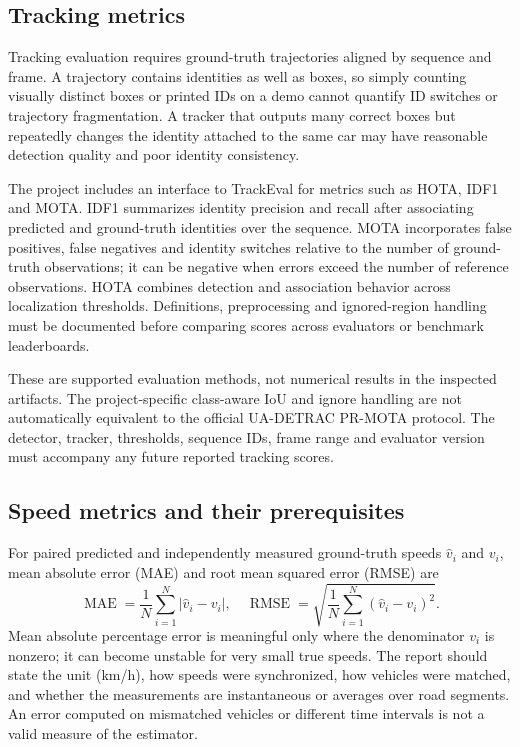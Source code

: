 \subsection{Tracking metrics}
Tracking evaluation requires ground-truth trajectories aligned by sequence and frame. A trajectory contains identities as well as boxes, so simply counting visually distinct boxes or printed IDs on a demo cannot quantify ID switches or trajectory fragmentation. A tracker that outputs many correct boxes but repeatedly changes the identity attached to the same car may have reasonable detection quality and poor identity consistency.

The project includes an interface to TrackEval for metrics such as HOTA, IDF1 and MOTA. IDF1 summarizes identity precision and recall after associating predicted and ground-truth identities over the sequence. MOTA incorporates false positives, false negatives and identity switches relative to the number of ground-truth observations; it can be negative when errors exceed the number of reference observations. HOTA combines detection and association behavior across localization thresholds. Definitions, preprocessing and ignored-region handling must be documented before comparing scores across evaluators or benchmark leaderboards.

These are supported evaluation methods, not numerical results in the inspected artifacts. The project-specific class-aware IoU and ignore handling are not automatically equivalent to the official UA-DETRAC PR-MOTA protocol. The detector, tracker, thresholds, sequence IDs, frame range and evaluator version must accompany any future reported tracking scores.

\subsection{Speed metrics and their prerequisites}
For paired predicted and independently measured ground-truth speeds $\widehat v_i$ and $v_i$, mean absolute error (MAE) and root mean squared error (RMSE) are
\begin{equation}
\operatorname{MAE}=\frac{1}{N}\sum_{i=1}^{N}|\widehat v_i-v_i|,\quad
\operatorname{RMSE}=\sqrt{\frac{1}{N}\sum_{i=1}^{N}(\widehat v_i-v_i)^2}.
\end{equation}
Mean absolute percentage error is meaningful only where the denominator $v_i$ is nonzero; it can become unstable for very small true speeds. The report should state the unit (km/h), how speeds were synchronized, how vehicles were matched, and whether the measurements are instantaneous or averages over road segments. An error computed on mismatched vehicles or different time intervals is not a valid measure of the estimator.

